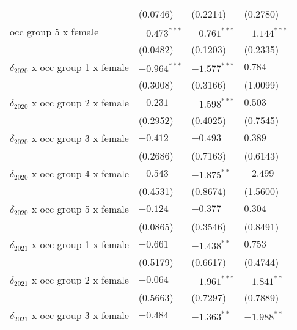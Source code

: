 \begin{tabular}{llll}
                                       &           (0.0746) &           (0.2214) &           (0.2780) \\
occ group 5 x female                   &     $-0.473^{***}$ &     $-0.761^{***}$ &     $-1.144^{***}$ \\
                                       &           (0.0482) &           (0.1203) &           (0.2335) \\
$\delta_{2020}$ x occ group 1 x female &     $-0.964^{***}$ &     $-1.577^{***}$ &            $0.784$ \\
                                       &           (0.3008) &           (0.3166) &           (1.0099) \\
$\delta_{2020}$ x occ group 2 x female &           $-0.231$ &     $-1.598^{***}$ &            $0.503$ \\
                                       &           (0.2952) &           (0.4025) &           (0.7545) \\
$\delta_{2020}$ x occ group 3 x female &           $-0.412$ &           $-0.493$ &            $0.389$ \\
                                       &           (0.2686) &           (0.7163) &           (0.6143) \\
$\delta_{2020}$ x occ group 4 x female &           $-0.543$ &      $-1.875^{**}$ &           $-2.499$ \\
                                       &           (0.4531) &           (0.8674) &           (1.5600) \\
$\delta_{2020}$ x occ group 5 x female &           $-0.124$ &           $-0.377$ &            $0.304$ \\
                                       &           (0.0865) &           (0.3546) &           (0.8491) \\
$\delta_{2021}$ x occ group 1 x female &           $-0.661$ &      $-1.438^{**}$ &            $0.753$ \\
                                       &           (0.5179) &           (0.6617) &           (0.4744) \\
$\delta_{2021}$ x occ group 2 x female &           $-0.064$ &     $-1.961^{***}$ &      $-1.841^{**}$ \\
                                       &           (0.5663) &           (0.7297) &           (0.7889) \\
$\delta_{2021}$ x occ group 3 x female &           $-0.484$ &      $-1.363^{**}$ &      $-1.988^{**}$ \\

\end{tabular}
